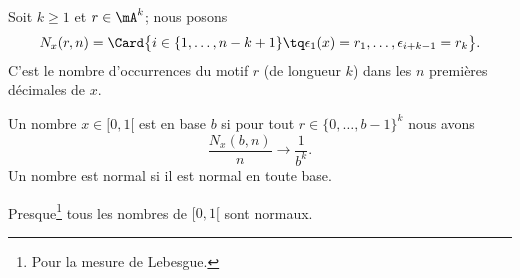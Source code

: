Soit \( k\geq 1\) et \( r\in \mA^k\); nous posons
\begin{equation}
    N_x(r,n)=\Card\big\{   i\in\{ 1,\ldots, n-k+1 \}\tq \epsilon_1(x)=r_1,\ldots, \epsilon_{i+k-1}=r_k \big\}.
\end{equation}
C'est le nombre d'occurrences du motif \( r\) (de longueur \( k\)) dans les \( n\) premières décimales de \( x\).

\begin{definition}
    Un nombre \( x\in\mathopen[ 0 , 1 [\) est  en base \( b\) si pour tout \( r\in\{ 0,\ldots, b-1 \}^k\) nous avons
        \begin{equation}
            \frac{ N_x(b,n) }{ n }\to \frac{1}{ b^k }.
        \end{equation}
    Un nombre est normal si il est normal en toute base.
\end{definition}

\begin{proposition}     \label{PropEEOXLae}
    Presque\footnote{Pour la mesure de Lebesgue.} tous les nombres de \( \mathopen[ 0 , 1 [\) sont normaux.    
\end{proposition}

